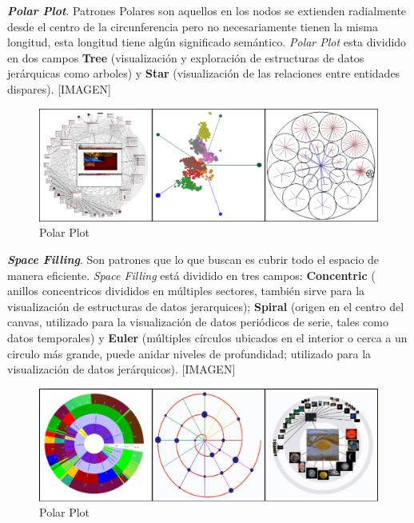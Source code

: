 \textbf{\textit{Polar Plot}}.  Patrones Polares son aquellos en los nodos se extienden radialmente desde el centro de la circunferencia pero no necesariamente tienen la misma longitud, esta longitud tiene algún significado semántico. \textit{Polar Plot} esta dividido en dos campos \textbf{Tree} (visualización y exploración de estructuras de datos jerárquicas como arboles) y \textbf{Star} (visualización de las relaciones entre entidades dispares).
\textcolor[rgb]{0.2,0.8,0.2}{[IMAGEN]}
\begin{figure}[!h]
\centering
\includegraphics[width=0.6\columnwidth]{figs/PolarPlot}%
\caption{Polar Plot}%
\label{fig:PolarPlot}%
\end{figure}

\textbf{\textit{Space Filling}}. Son patrones que lo que buscan es cubrir todo el espacio de manera eficiente.  \textit{Space Filling} está dividido en tres campos: \textbf{Concentric} ( anillos concentricos divididos en múltiples sectores, también sirve para la visualización de estructuras de datos jerarquices); \textbf{Spiral} (origen en el centro del canvas, utilizado para la visualización de datos periódicos de serie, tales como datos temporales) y \textbf{Euler} (múltiples círculos ubicados en el interior o cerca a un circulo más grande, puede anidar niveles de profundidad; utilizado para la visualización de datos jerárquicos).
\textcolor[rgb]{0.2,0.8,0.2}{[IMAGEN]}
\begin{figure}[!h]
\centering
\includegraphics[width=0.6\columnwidth]{figs/SpaceFilling}%
\caption{Polar Plot}%
\label{fig:SpaceFilling}%
\end{figure}

